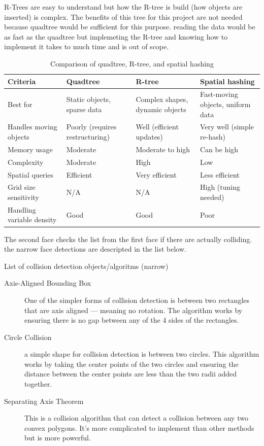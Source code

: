 \documentclass{projdoc}
\begin{document}
R-Trees are easy to understand but how the R-tree is build (how objects are inserted)
is complex. The benefits of this tree for this project are not needed because
quadtree would be sufficient for this purpose. reading the data would be as fast as
the quadtree but implemeting the R-tree and knowing how to implement it takes to much
time and is out of scope.

\begin{table}
	\begin{tabularx}{\linewidth}{p{8em}XXX}
		\toprule
		Criteria & Quadtree & R-tree & Spatial hashing \\
		\midrule
		Best for & Static objects, sparse data & Complex shapes, dynamic objects & Fast-moving objects, uniform data \\
		\midrule
		Handles moving objects & Poorly (requires restructuring) & Well (efficient updates) & Very well (simple re-hash) \\
		\midrule
		Memory usage & Moderate & Moderate to high & Can be high \\
		\midrule
		Complexity & Moderate & High & Low \\
		\midrule
		Spatial queries & Efficient & Very efficient & Less efficient \\
		\midrule
		Grid size sensitivity & N/A & N/A & High (tuning needed) \\
		\midrule
		Handling variable density & Good & Good & Poor \\
		\bottomrule
	\end{tabularx}
	\caption{Comparison of quadtree, R-tree, and spatial hashing}
\end{table}


The second face checks the list from the first face if there are actually colliding. the narrow face detections are descripted in the list below.

List of collision detection objects/algoritms (narrow)
\begin{description}
	\item[Axis-Aligned Bounding Box]One of the simpler forms of collision detection is
		between two rectangles that are axis aligned --- meaning no rotation. The
		algorithm works by ensuring there is no gap between any of the 4 sides of the
		rectangles.
	\item[Circle Collision] a simple shape for collision detection is between two
		circles. This algorithm works by taking the center points of the two circles and
		ensuring the distance between the center points are less than the two radii added
		together.
	\item[Separating Axis Theorem] This is a collision algorithm that can detect a
		collision between any two convex polygons. It's more complicated to implement
		than other methods but is more powerful.
\end{description}
\end{document}
